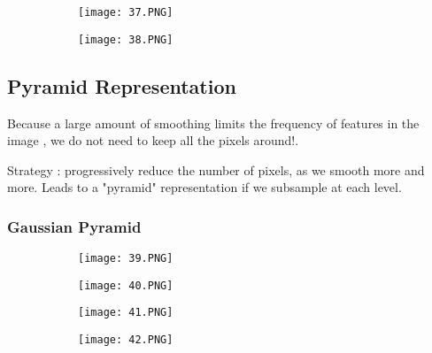 \documentclass{article}
\begin{document}
\begin{figure}[ht!]
  \centering
  \begin{subfigure}[b]{0.4\linewidth}
    \texttt{[image: 37.PNG]}
  \end{subfigure}
  \begin{subfigure}[b]{0.4\textwidth}
         \centering
         \texttt{[image: 38.PNG]}
     \end{subfigure}
\end{figure}

\vspace{50mm}

\subsection{Pyramid Representation}

Because a large amount of smoothing limits the frequency of features in the image , we do not need to keep all the pixels around!.

Strategy : progressively reduce the number of pixels, as we smooth more and more.
Leads to a "pyramid" representation if we subsample at each level.

\subsubsection{Gaussian Pyramid}

\begin{figure}[ht!]
  \centering
  \begin{subfigure}[b]{0.4\linewidth}
    \texttt{[image: 39.PNG]}
  \end{subfigure}
  \begin{subfigure}[b]{0.4\textwidth}
         \centering
         \texttt{[image: 40.PNG]}
     \end{subfigure}
\end{figure}

\begin{figure}[ht!]
  \centering
  \begin{subfigure}[b]{0.4\linewidth}
    \texttt{[image: 41.PNG]}
  \end{subfigure}
  \begin{subfigure}[b]{0.4\textwidth}
         \centering
         \texttt{[image: 42.PNG]}
     \end{subfigure}
\end{figure}
\end{document}
